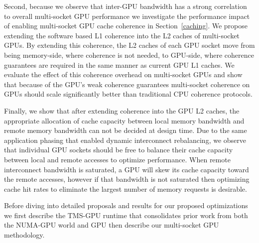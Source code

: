 Second, because we observe that inter-GPU bandwidth has a strong correlation to
overall multi-socket GPU performance we investigate the performance impact of
enabling multi-socket GPU cache coherence in Section~\ref{caching}.  We propose
extending the software based L1 coherence into the L2 caches of multi-socket
GPUs.  By extending this coherence, the L2 caches of each GPU socket move from
being memory-side, where coherence is not needed, to GPU-side, where coherence
guarantees are required in the same manner as current GPU L1 caches.  We
evaluate the effect of this coherence overhead on multi-socket GPUs and show
that because of the GPU's weak coherence guarantees multi-socket coherence on
GPUs should scale significantly better than traditional CPU coherence
protocols.

Finally, we show that after extending coherence into the GPU L2 caches, the
appropriate allocation of cache capacity between local memory bandwidth and
remote memory bandwidth can not be decided at design time.  Due to the same
application phasing that enabled dynamic interconnect rebalancing, we observe
that individual GPU sockets should be free to balance their cache capacity
between local and remote accesses to optimize performance.  When remote
interconnect bandwidth is saturated, a GPU will skew its cache capacity toward
the remote accesses,  however if that bandwidth is not saturated then
optimizing cache hit rates to eliminate the largest number of memory requests
is desirable.

Before diving into detailed proposals and results for our proposed
optimizations we first describe the TMS-GPU runtime that consolidates
prior work from both the NUMA-GPU world and GPU then describe our multi-socket
GPU methodology.


